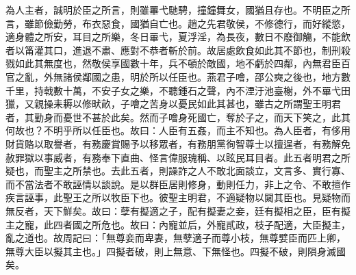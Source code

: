 \begin{pinyinscope}
為人主者，誠明於臣之所言，則雖罼弋馳騁，撞鐘舞女，國猶且存也。不明臣之所言，雖節儉勤勞，布衣惡食，國猶自亡也。趙之先君敬侯，不修德行，而好縱慾，適身體之所安，耳目之所樂，冬日罼弋，夏浮淫，為長夜，數日不廢御觴，不能飲者以筩灌其口，進退不肅、應對不恭者斬於前。故居處飲食如此其不節也，制刑殺戮如此其無度也，然敬侯享國數十年，兵不頓於敵國，地不虧於四鄰，內無君臣百官之亂，外無諸侯鄰國之患，明於所以任臣也。燕君子噲，邵公奭之後也，地方數千里，持戟數十萬，不安子女之樂，不聽鍾石之聲，內不湮汙池臺榭，外不罼弋田獵，又親操耒耨以修畎畝，子噲之苦身以憂民如此其甚也，雖古之所謂聖王明君者，其勤身而憂世不甚於此矣。然而子噲身死國亡，奪於子之，而天下笑之，此其何故也？不明乎所以任臣也。故曰：人臣有五姦，而主不知也。為人臣者，有侈用財貨賂以取譽者，有務慶賞賜予以移眾者，有務朋黨徇智尊士以擅逞者，有務解免赦罪獄以事威者，有務奉下直曲、怪言偉服瑰稱、以眩民耳目者。此五者明君之所疑也，而聖主之所禁也。去此五者，則譟詐之人不敢北面談立，文言多、實行寡、而不當法者不敢誣情以談說。是以群臣居則修身，動則任力，非上之令、不敢擅作疾言誣事，此聖王之所以牧臣下也。彼聖主明君，不適疑物以闚其臣也。見疑物而無反者，天下鮮矣。故曰：孽有擬適之子，配有擬妻之妾，廷有擬相之臣，臣有擬主之寵，此四者國之所危也。故曰：內寵並后，外寵貳政，枝子配適，大臣擬主，亂之道也。故周記曰：「無尊妾而卑妻，無孽適子而尊小枝，無尊嬖臣而匹上卿，無尊大臣以擬其主也。」四擬者破，則上無意、下無怪也。四擬不破，則隕身滅國矣。


\end{pinyinscope}